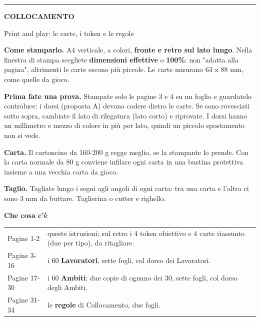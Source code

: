 \documentclass[10pt]{article}
\begin{document}
\color{petrolio}

\vspace*{16mm}\hspace*{18mm}\begin{minipage}[t]{174mm}\fontsize{10.5}{14.2}\selectfont\setlength{\parskip}{2.4mm}
{\color{rosa}\rule{14mm}{2.8pt}}\par\vspace{1mm}
{\fontsize{24}{27}\selectfont\bfseries COLLOCAMENTO\par}
{\fontsize{12}{15}\selectfont Print and play: le carte, i token e le regole\par}
\vspace{5mm}
\textbf{Come stamparlo.} A4 verticale, a colori, \textbf{fronte e retro sul lato lungo}. Nella finestra di stampa scegliete \textbf{dimensioni effettive} o \textbf{100\%}: non "adatta alla pagina", altrimenti le carte escono più piccole. Le carte misurano 63 x 88 mm, come quelle da gioco.

\textbf{Prima fate una prova.} Stampate solo le pagine 3 e 4 su un foglio e guardatelo controluce: i dorsi (proposta A) devono cadere dietro le carte. Se sono rovesciati sotto sopra, cambiate il lato di rilegatura (lato corto) e riprovate. I dorsi hanno un millimetro e mezzo di colore in più per lato, quindi un piccolo spostamento non si vede.

\textbf{Carta.} Il cartoncino da 160-200 g regge meglio, se la stampante lo prende. Con la carta normale da 80 g conviene infilare ogni carta in una bustina protettiva insieme a una vecchia carta da gioco.

\textbf{Taglio.} Tagliate lungo i segni agli angoli di ogni carta: tra una carta e l'altra ci sono 3 mm da buttare. Taglierina o cutter e righello.

\vspace{2mm}
{\fontsize{13}{16}\selectfont\bfseries Che cosa c'è\par}
\vspace{1mm}
\begin{tabular}{@{}p{30mm}p{140mm}@{}}
Pagine 1-2 & queste istruzioni; sul retro i 4 token obiettivo e 4 carte riassunto (due per tipo), da ritagliare. \\[1mm]
Pagine 3-16 & i 60 \textbf{Lavoratori}, sette fogli, col dorso dei Lavoratori. \\[1mm]
Pagine 17-30 & i 60 \textbf{Ambiti}: due copie di ognuno dei 30, sette fogli, col dorso degli Ambiti. \\[1mm]
Pagine 31-34 & le \textbf{regole} di Collocamento, due fogli. \\
\end{tabular}


\end{minipage}
\end{document}
